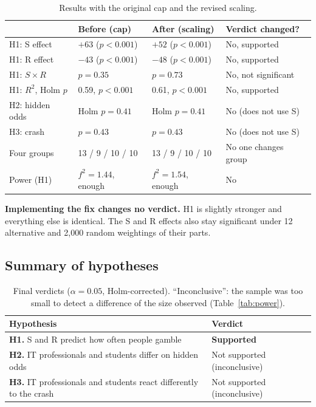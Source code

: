 \documentclass[10pt,a4paper]{article}
\begin{document}
\begin{table}[H]
\centering\small
\begin{tabular}{llll}
\toprule
 & Before (cap) & After (scaling) & Verdict changed? \\
\midrule
H1: S effect & $+63$ ($p<0.001$) & $+52$ ($p<0.001$) & No, supported \\
H1: R effect & $-43$ ($p<0.001$) & $-48$ ($p<0.001$) & No, supported \\
H1: $S \times R$ & $p = 0.35$ & $p = 0.73$ & No, not significant \\
H1: $R^2$, Holm $p$ & 0.59, $p<0.001$ & 0.61, $p<0.001$ & No, supported \\
H2: hidden odds & Holm $p = 0.41$ & Holm $p = 0.41$ & No (does not use S) \\
H3: crash & $p = 0.43$ & $p = 0.43$ & No (does not use S) \\
Four groups & 13 / 9 / 10 / 10 & 13 / 9 / 10 / 10 & No one changes group \\
Power (H1) & $f^2 = 1.44$, enough & $f^2 = 1.54$, enough & No \\
\bottomrule
\end{tabular}
\caption{Results with the original cap and the revised scaling.}
\label{tab:fix}
\end{table}

\textbf{Implementing the fix changes no verdict.} H1 is slightly stronger and everything else is identical. The S and R effects also stay significant under 12 alternative and 2,000 random weightings of their parts.
\subsection{Summary of hypotheses}

\begin{table}[H]
\centering\small
\begin{tabular}{ll}
\toprule
Hypothesis & Verdict \\
\midrule
\textbf{H1.} S and R predict how often people gamble & \textbf{Supported} \\
\textbf{H2.} IT professionals and students differ on hidden odds & Not supported (inconclusive) \\
\textbf{H3.} IT professionals and students react differently to the crash & Not supported (inconclusive) \\
\bottomrule
\end{tabular}
\caption{Final verdicts ($\alpha = 0.05$, Holm-corrected). ``Inconclusive'': the sample was too small to detect a difference of the size observed (Table~\ref{tab:power}).}
\label{tab:verdicts}
\end{table}
\end{document}
